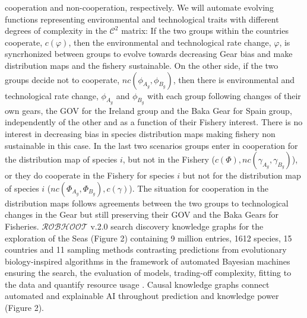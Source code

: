 \documentclass[11pt, a4paper]{article} %
\begin{document}
{{cooperation and non-cooperation, respectively. We will automate
evolving functions representing environmental and technological traits
with different degrees of complexity in the $\mathcal{C}^2$ matrix: If
the two groups within the countries cooperate, $c(\varphi)$, then the
environmental and technological rate change, $\varphi$, is
syncrhonized between groups to evolve towards decreasing Gear bias and
make distribution maps and the fishery sustainable. On the other side,
if the two groups decide not to cooperate,
$nc(\phi_{A_{g}},\phi_{B_{g}})$, then there is environmental and
technological rate change, $\phi_{A_{g}}$ and $\phi_{B_{g}}$ with each
group following changes of their own gears, the GOV for the Ireland
group and the Baka Gear for Spain group, independently of the other
and as a function of their Fishery interest. There is no interest in
decreasing bias in species distribution maps making fishery non
sustainable in this case. In the last two scenarios groups enter in
cooperation for the distribution map of species $i$, but not in the
Fishery ($c(\Phi), nc(\gamma_{A_{g}},\gamma_{B_{g}})$), or they do
cooperate in the Fishery for species $i$ but not for the distribution
map of species $i$ ($nc(\Phi_{A_{g}},\Phi_{B_{g}}), c(\gamma)$). The
situation for cooperation in the distribution maps follows agreements
between the two groups to technological changes in the Gear but still
preserving their GOV and the Baka Gears for
Fisheries. $\mathcal{ROBHOOT}$ v.2.0 search discovery knowledge graphs
for the exploration of the Seas (Figure 2) containing 9 million
entries, 1612 species, 15 countries and 11 sampling methods
contrasting predictions from evolutionary biology-inspired algorithms
in the framework of automated Bayesian machines ensuring the search,
the evaluation of models, trading-off complexity, fitting to the data
and quantify resource usage \citep{Guimera2020,Steinruecken}. Causal
knowledge graphs connect automated and explainable AI throughout
prediction and knowledge power (Figure 2).}

}
\end{document}
